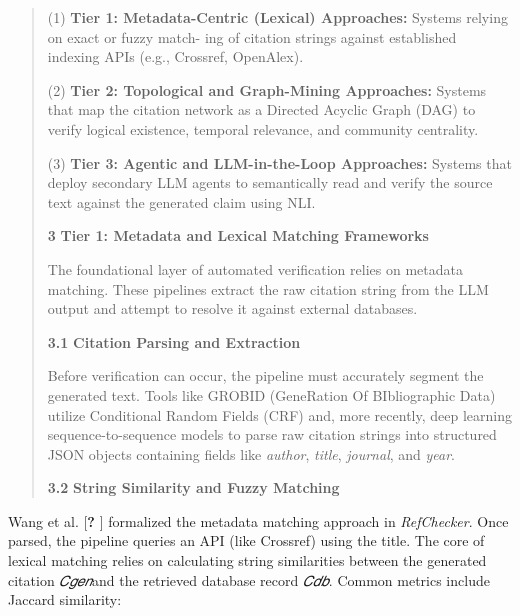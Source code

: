 \documentclass[
]{article}
\begin{document}
\begin{quote}
(1) \textbf{Tier 1: Metadata-Centric (Lexical) Approaches:} Systems
relying on exact or fuzzy match- ing of citation strings against
established indexing APIs (e.g., Crossref, OpenAlex).

(2) \textbf{Tier 2: Topological and Graph-Mining Approaches:} Systems
that map the citation network as a Directed Acyclic Graph (DAG) to
verify logical existence, temporal relevance, and community centrality.

(3) \textbf{Tier 3: Agentic and LLM-in-the-Loop Approaches:} Systems
that deploy secondary LLM agents to semantically read and verify the
source text against the generated claim using NLI.

\textbf{3} \textbf{Tier 1: Metadata and Lexical Matching Frameworks}

The foundational layer of automated verification relies on metadata
matching. These pipelines extract the raw citation string from the LLM
output and attempt to resolve it against external databases.

\textbf{3.1} \textbf{Citation Parsing and Extraction}

Before verification can occur, the pipeline must accurately segment the
generated text. Tools like GROBID (GeneRation Of BIbliographic Data)
utilize Conditional Random Fields (CRF) and, more recently, deep
learning sequence-to-sequence models to parse raw citation strings into
structured JSON objects containing fields like \emph{author},
\emph{title}, \emph{journal}, and \emph{year}.

\textbf{3.2} \textbf{String Similarity and Fuzzy Matching}
\end{quote}

Wang et al. {[}\textbf{?} {]} formalized the metadata matching approach
in \emph{RefChecker}. Once parsed, the pipeline queries an API (like
Crossref) using the title. The core of lexical matching relies on
calculating string similarities between the generated citation
\emph{𝐶𝑔𝑒𝑛}and the retrieved database record \emph{𝐶𝑑𝑏}. Common metrics
include Jaccard similarity:
\end{document}
